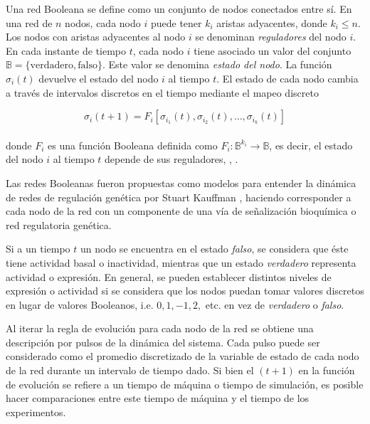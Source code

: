 Una red Booleana se define como un conjunto de nodos conectados entre sí. En una red de $n$ nodos, cada nodo $i$ puede tener $k_i$ aristas adyacentes, donde $k_i \le n$. Los nodos con aristas adyacentes al nodo $i$ se denominan \emph{reguladores} del nodo $i$. En cada instante de tiempo $t$, cada nodo $i$ tiene asociado un valor del conjunto $\mathbb{B} = \{\mathrm{verdadero}, \mathrm{falso}\}$. Este valor se denomina \emph{estado del nodo}. La función $\sigma_i(t)$ devuelve el estado del nodo $i$ al tiempo $t$. El estado de cada nodo cambia a través de intervalos discretos en el tiempo mediante el mapeo discreto

\begin{equation}\label{eqn:kaufman}
\sigma_i(t+1) = F_i[\sigma_{i_1}(t), \sigma_{i_2}(t),\ldots, \sigma_{i_k}(t)]
\end{equation}
\\
donde $F_i$ es una función Booleana definida como $F_i: \mathbb{B}^{k_i} \rightarrow \mathbb{B}$, es decir, el estado del nodo $i$ al tiempo $t$ depende de sus reguladores,  \citeauthor{Kauffman:1969up} \citep{Kauffman:1969up}, \citeauthor{Gershenson:2004uq} \citep{Gershenson:2004uq}.

Las redes Booleanas fueron propuestas como modelos para entender la dinámica de redes de regulación genética por Stuart Kauffman \citeauthor{Kauffman:1969up} \citep{Kauffman:1969up}, haciendo corresponder a cada nodo de la red con un componente de una vía de señalización  bioquímica o red regulatoria genética. 

Si a un tiempo $t$ un nodo se encuentra en el estado \emph{falso}, se considera que éste tiene actividad basal o inactividad, mientras que un estado \emph{verdadero} representa actividad o expresión. En general, se pueden establecer distintos niveles de expresión o actividad si se considera que los nodos puedan tomar valores discretos en lugar de valores Booleanos, i.e. $0, 1, -1, 2,$ etc. en vez de \emph{verdadero} o \emph{falso}.

Al iterar la regla de evolución para cada nodo de la red se obtiene una descripción por pulsos de la dinámica del sistema. Cada pulso puede ser considerado como el promedio discretizado de la variable de estado de cada nodo de la red durante un intervalo de tiempo dado. Si bien el $(t+1)$ en la función de evolución se refiere a un tiempo de máquina o tiempo de simulación, es posible hacer comparaciones entre este tiempo de máquina y el tiempo de los experimentos.

